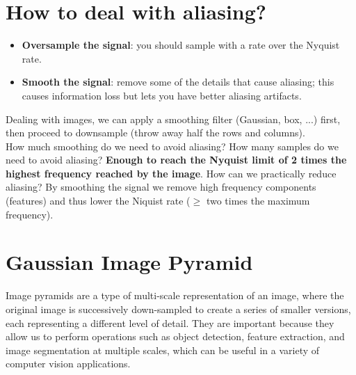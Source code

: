\documentclass{article}
\begin{document}
\section*{How to deal with aliasing?}

\begin{itemize}
    \item \textbf{Oversample the signal}: you should sample with a rate over the Nyquist rate.
    \item \textbf{Smooth the signal}: remove some of the details that cause aliasing; this causes information loss but lets you have better aliasing artifacts. 
\end{itemize}

Dealing with images, we can apply a smoothing filter (Gaussian, box, ...) first, then proceed to downsample (throw away half the rows and columns). \\

How much smoothing do we need to avoid aliasing? How many samples do we need to avoid aliasing? \textbf{Enough to reach the Nyquist limit of 2 times the highest frequency reached by the image}. How can we practically reduce aliasing? By smoothing the signal we remove high frequency components (features) and thus lower the Niquist rate ($\geq$ two times the maximum frequency).

\newpage

\section*{Gaussian Image Pyramid}

Image pyramids are a type of multi-scale representation of an image, where the original image is successively down-sampled to create a series of smaller versions, each representing a different level of detail. They are important because they allow us to perform operations such as object detection, feature extraction, and image segmentation at multiple scales, which can be useful in a variety of computer vision applications.
\end{document}
